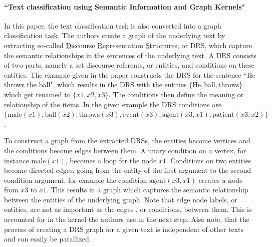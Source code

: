 \paragraph{``Text classification using Semantic Information and Graph Kernels" \cite{Gaspar2011}}
In this paper, the text classification task is also converted into a graph classification task.
The authors create a graph of the underlying text by extracting so-called \underline{D}iscourse \underline{R}epresentation \underline{S}tructures, or DRS, which capture the semantic relationships in the sentences of the underlying text.
A DRS consists of two parts, namely a set discourse referents, or entities, and conditions on these entities.
The example given in the paper constructs the DRS for the sentence ``He throws the ball", which results in the DRS with the entities $\{\text{He}, \text{ball}, \text{throws}\}$ which get renamed to $\{x1, x2, x3\}$.
The conditions then define the meaning or relationship of the items. In the given example the DRS conditions are $\{\text{male}(x1), \text{ball}(x2), \text{throws}(x3), \text{event}(x3), \text{agent}(x3, x1), \text{patient}(x3, x2)\}$.


To construct a graph from the extracted DRSs, the entities become vertices and the conditions become edges between them.
A unary condition on a vertex, for instance $\text{male}(x1)$, becomes a loop for the node $x1$.
Conditions on two entities become directed edges, going from the entity of the first argument to the second condition argument, for example the condition $\text{agent}(x3, x1)$ creates a node from $x3$ to $x1$.
This results in a graph which captures the semantic relationship between the entities of the underlying graph.
Note that edge node labels, or entities, are not as important as the edges , or conditions, between them.
This is accounted for in the kernel the authors use in the next step.
Also note, that the process of creating a DRS graph for a given text is independent of other texts and can easily be parallized.

